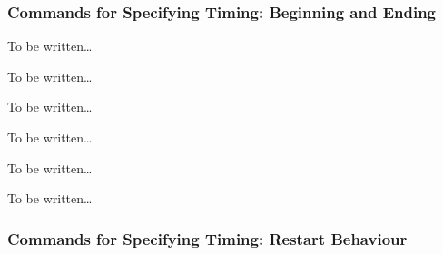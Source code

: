 \subsubsection{Commands for Specifying Timing: Beginning and Ending}


\begin{command}{\pgfsys@animation@offset{}}
  To be written\dots
\end{command}

\begin{command}{\pgfsys@animation@syncbegin{}}
  To be written\dots
\end{command}

\begin{command}{\pgfsys@animation@syncend{}}
  To be written\dots
\end{command}

\begin{command}{\pgfsys@animation@event{}}
  To be written\dots
\end{command}

\begin{command}{\pgfsys@animation@repeat@event{}}
  To be written\dots
\end{command}

\begin{command}{\pgfsys@animation@accesskey{}}
  To be written\dots
\end{command}



\subsubsection{Commands for Specifying Timing: Restart Behaviour}

